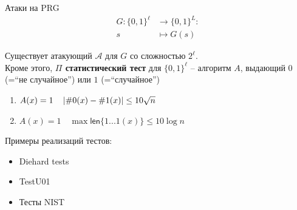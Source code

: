 \documentclass[usenames,dvipsnames,8pt,aspectratio=169]{beamer}
\begin{document}
\begin{frame}{Атаки на PRG}
\Large 
\vspace{-15pt}
\begin{align*}
G : \{0,1\}^{\ell} & \rightarrow \{0,1\}^{L}:	\\
s & \mapsto G(s) 
\end{align*}

Существует атакующий $\mathcal{A}$ для $G$ со сложностью $2^\ell$. \\[10pt]


Кроме этого,  {\color{Orange}\textbf{$\Pi$ статистический тест}} для $\{0,1\}^\ell$ --  алгоритм $A$, выдающий $0$ (=``не случайное'') или $1$ (=``случайное'') \\
\LARGE
\begin{enumerate}
	\item $A(x) = 1 \quad \left\lvert\# 0(x) - \# 1(x)\right\rvert \leq 10 \sqrt{n}$  \\ [10pt]
	\item $A(x) = 1 \quad \max \mathsf{len}\{1...1(x) \} \leq 10 \log n$  \\ [10pt]
\end{enumerate}

\vspace{4pt}

Примеры реализаций тестов:
\begin{itemize}
	\item Diehard tests
	\item TestU01
	\item Тесты NIST
\end{itemize}

\end{frame}


%
%	
%	
%

%
\end{document}
